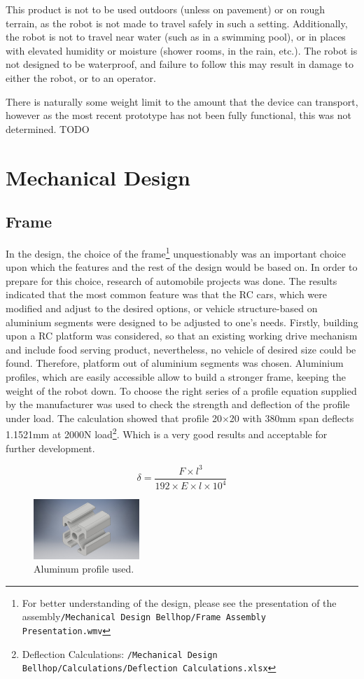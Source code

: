 \documentclass[11pt]{article}
\begin{document}
This product is not to be used outdoors (unless on pavement) or on rough terrain, as the robot is not made to travel safely in such a setting. Additionally, the robot is not to travel near water (such as in a swimming pool), or in places with elevated humidity or moisture (shower rooms, in the rain, etc.). The robot is not designed to be waterproof, and failure to follow this may result in damage to either the robot, or to an operator.


There is naturally some weight limit to the amount that the device can transport, however as the most recent prototype has not been fully functional, this was not determined.
TODO
\newpage
\section{Mechanical Design}
\subsection*{Frame}
In the design, the choice of the frame\footnote{For better understanding of the design, please see the presentation of the assembly\texttt{/Mechanical Design Bellhop/Frame Assembly Presentation.wmv}} unquestionably was an important choice upon which the features and the rest of the design would be based on. In order to prepare for this choice, research of automobile projects was done. The results indicated that the most common feature was that the RC cars, which were modified and adjust to the desired options, or vehicle structure-based on aluminium segments were designed to be adjusted to one's needs. Firstly, building upon a RC platform was considered, so that an existing working drive mechanism and include food serving product, nevertheless, no vehicle of desired size could be found. Therefore, platform out of aluminium segments was chosen. Aluminium profiles, which are easily accessible allow to build a stronger frame, keeping the weight of the robot down. To choose the right series of a profile equation supplied by the manufacturer was used to check the strength and deflection of the profile under load. The calculation showed that profile 20$\times$20 with 380mm span deflects 1.1521mm at 2000N load\footnote{Deflection Calculations: \texttt{/Mechanical Design Bellhop/Calculations/Deflection Calculations.xlsx}}. Which is a very good results and acceptable for further development.

$$\delta=\frac{F\times l^3}{192\times E\times l\times 10^4}$$


\begin{figure}
  \includegraphics[width=4cm]{profile}
  \caption{Aluminum profile used.}
  \label{profile}
\end{figure}
\end{document}
